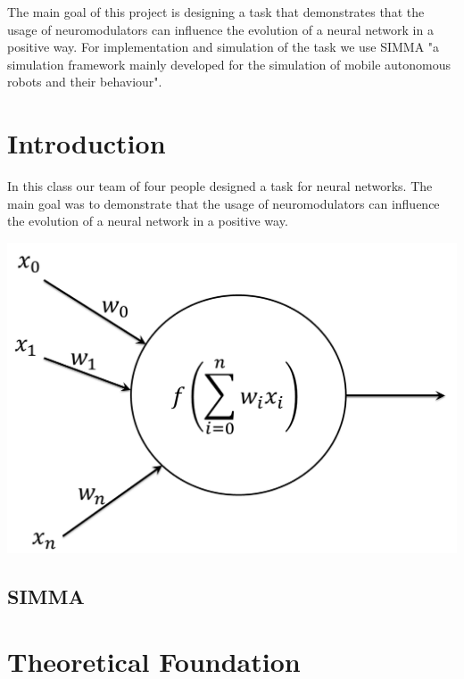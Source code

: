 \documentclass[12pt,fleqn,a4paper]{article}
\begin{document}
\clearpage
\pagestyle{headings}
\setcounter{page}{1}
\setcounter{page}{1}

\tableofcontents
\newpage

\abstract
{The main goal of this project is designing a task that demonstrates that the usage of neuromodulators can influence the evolution of a neural network in a positive way. For implementation and simulation of the task we use SIMMA "a simulation framework mainly developed for the simulation of mobile autonomous robots and their behaviour".}

\section{Introduction}
In this class our team of four people designed a task for neural networks.  The main goal was to demonstrate that the usage of neuromodulators can influence the evolution of a neural network in a positive way.

\begin{center}
\includegraphics[scale=0.3]{img/neuron.png}
\end{center}


\subsection{SIMMA}

\section{Theoretical Foundation}
\end{document}
